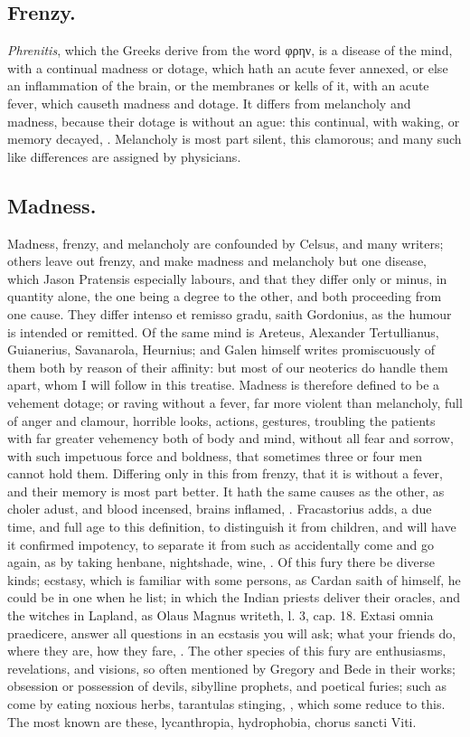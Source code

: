 {\subsection{Frenzy.}
\emph{Phrenitis}, which the Greeks derive from the word \textgreek{φρην}, is
a disease of the mind, with a continual madness or dotage, which hath
an acute fever annexed, or else an inflammation of the brain, or the
membranes or kells of it, with an acute fever, which causeth madness
and dotage. It differs from melancholy and madness, because their
dotage is without an ague: this continual, with waking, or memory
decayed, \etc{}. Melancholy is most part silent, this clamorous; and many
such like differences are assigned by physicians.

\subsection{Madness.}
Madness, frenzy, and melancholy are confounded by Celsus,
and many writers; others leave out frenzy, and make madness and
melancholy but one disease, which Jason Pratensis especially
labours, and that they differ only  or minus, in quantity
alone, the one being a degree to the other, and both proceeding from
one cause. They differ intenso et remisso gradu, saith Gordonius,
as the humour is intended or remitted. Of the same mind is
Areteus, Alexander Tertullianus, Guianerius, Savanarola, Heurnius;
and Galen himself writes promiscuously of them both by reason of their
affinity: but most of our neoterics do handle them apart, whom I will
follow in this treatise. Madness is therefore defined to be a vehement
dotage; or raving without a fever, far more violent than melancholy,
full of anger and clamour, horrible looks, actions, gestures, troubling
the patients with far greater vehemency both of body and mind, without
all fear and sorrow, with such impetuous force and boldness, that
sometimes three or four men cannot hold them. Differing only in this
from frenzy, that it is without a fever, and their memory is most part
better. It hath the same causes as the other, as choler adust, and
blood incensed, brains inflamed, \etc{}. Fracastorius adds, a due
time, and full age to this definition, to distinguish it from children,
and will have it confirmed impotency, to separate it from such as
accidentally come and go again, as by taking henbane, nightshade, wine,
\etc{}. Of this fury there be diverse kinds; ecstasy, which is familiar
with some persons, as Cardan saith of himself, he could be in one when
he list; in which the Indian priests deliver their oracles, and the
witches in Lapland, as Olaus Magnus writeth, \textlatin{l. 3, cap. 18. Extasi
omnia praedicere}, answer all questions in an ecstasis you will ask;
what your friends do, where they are, how they fare, \etc{}. The other
species of this fury are enthusiasms, revelations, and visions, so
often mentioned by Gregory and Bede in their works; obsession or
possession of devils, sibylline prophets, and poetical furies; such as
come by eating noxious herbs, tarantulas stinging, \etc{}, which some
reduce to this. The most known are these, lycanthropia, hydrophobia,
\textlatin{chorus sancti Viti}.

}
